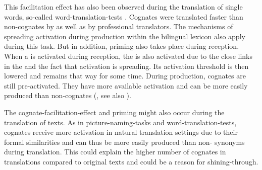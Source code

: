 \documentclass[output=paper]{LSP/langsci}
\begin{document}
This facilitation effect has also been observed during the translation of single words, so-called word-translation-tests \citep{Christoffels2006}. Cognates were translated faster than non-cognates by  as well as by professional translators. The mechanisms of spreading activation during production within the bilingual lexicon also apply during this task. But in addition, priming also takes place during reception. When a  is activated during reception, the   is also activated due to the close links in the  and the fact that activation is spreading. Its activation threshold is then lowered and remains that way for some time. During production, cognates are still pre-activated. They have more available activation and can be more easily produced than non-cognates (\citealt{Christoffels2006}, see also \citealt{DeGroot2011}). 

The cognate-facilitation-effect and priming might also occur during the translation of texts. As in picture-naming-tasks and word-translation-tests, cognates receive more activation in natural translation settings due to their formal similarities and can thus be more easily produced than non- synonyms during translation. This could explain the higher number of cognates in translations compared to original texts and could be a reason for shining-through.
\end{document}

